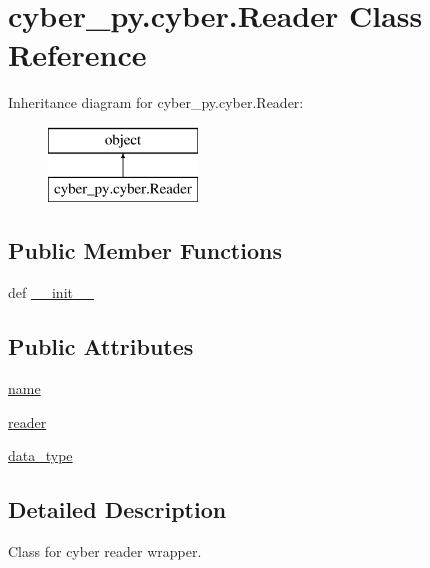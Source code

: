 \hypertarget{classcyber__py_1_1cyber_1_1Reader}{\section{cyber\-\_\-py.\-cyber.\-Reader Class Reference}
\label{classcyber__py_1_1cyber_1_1Reader}
}
Inheritance diagram for cyber\-\_\-py.\-cyber.\-Reader\-:\begin{figure}[H]
\begin{center}
\leavevmode
\includegraphics[height=2.000000cm]{classcyber__py_1_1cyber_1_1Reader}
\end{center}
\end{figure}
\subsection*{Public Member Functions}
\begin{DoxyCompactItemize}
\item 
def \hyperlink{classcyber__py_1_1cyber_1_1Reader_a662cb41eca7f3176c66d36c3c090b0e1}{\-\_\-\-\_\-init\-\_\-\-\_\-}
\end{DoxyCompactItemize}
\subsection*{Public Attributes}
\begin{DoxyCompactItemize}
\item 
\hyperlink{classcyber__py_1_1cyber_1_1Reader_a90bb93132165b6ad30246689544364f0}{name}
\item 
\hyperlink{classcyber__py_1_1cyber_1_1Reader_acef07a978cb31218464c83fccb690627}{reader}
\item 
\hyperlink{classcyber__py_1_1cyber_1_1Reader_a74d08b0258abb362b1448b4d29f28577}{data\-\_\-type}
\end{DoxyCompactItemize}


\subsection{Detailed Description}
\begin{DoxyVerb}Class for cyber reader wrapper.
\end{DoxyVerb}
 

